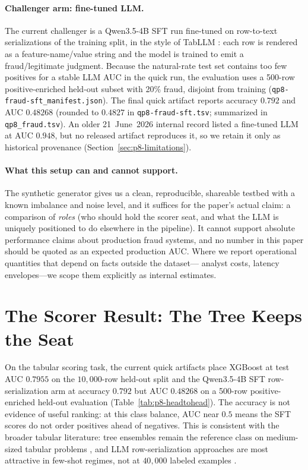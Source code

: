 \documentclass{article}
\providecommand{\tableref}[1]{Table~\ref{#1}}
\providecommand{\secref}[1]{Section~\ref{#1}}
\begin{document}
\paragraph{Challenger arm: fine-tuned LLM.}
The current challenger is a Qwen3.5-4B SFT run fine-tuned on row-to-text
serializations of the training split, in the style of TabLLM
\citep{hegselmann2023tabllm}: each row is rendered as a feature-name/value
string and the model is trained to emit a fraud/legitimate judgment. Because
the natural-rate test set contains too few positives for a stable LLM AUC in
the quick run, the evaluation uses a 500-row positive-enriched held-out subset
with 20\% fraud, disjoint from training
(\texttt{qp8-fraud-sft\_manifest.json}). The final quick artifact reports
accuracy $0.792$ and AUC $0.48268$ (rounded to $0.4827$ in
\texttt{qp8-fraud-sft.tsv}; summarized in \texttt{qp8\_fraud.tsv}). An older
21~June~2026 internal record listed a fine-tuned LLM at AUC $0.948$, but no
released artifact reproduces it, so we retain it only as historical provenance
(\secref{sec:p8-limitations}).

\paragraph{What this setup can and cannot support.}
The synthetic generator gives us a clean, reproducible, shareable testbed with
a known imbalance and noise level, and it suffices for the paper's actual
claim: a comparison of \emph{roles} (who should hold the scorer seat, and what
the LLM is uniquely positioned to do elsewhere in the pipeline). It cannot
support absolute performance claims about production fraud systems, and no
number in this paper should be quoted as an expected production AUC. Where we
report operational quantities that depend on facts outside the dataset---
analyst costs, latency envelopes---we scope them explicitly as internal
estimates.
 \section{The Scorer Result: The Tree Keeps the Seat}
\label{sec:p8-scorer}

On the tabular scoring task, the current quick artifacts place XGBoost at test
AUC $0.7955$ on the $10{,}000$-row held-out split and the Qwen3.5-4B SFT
row-serialization arm at accuracy $0.792$ but AUC $0.48268$ on a 500-row
positive-enriched held-out evaluation (\tableref{tab:p8-headtohead}). The
accuracy is not evidence of useful ranking: at this class balance, AUC near
$0.5$ means the SFT scores do not order positives ahead of negatives. This is
consistent with the broader tabular literature: tree ensembles
remain the reference class on medium-sized tabular problems
\citep{grinsztajn2022tree, shwartzziv2021tabular}, and LLM row-serialization
approaches are most attractive in few-shot regimes, not at $40{,}000$ labeled
examples \citep{hegselmann2023tabllm}.
\end{document}
